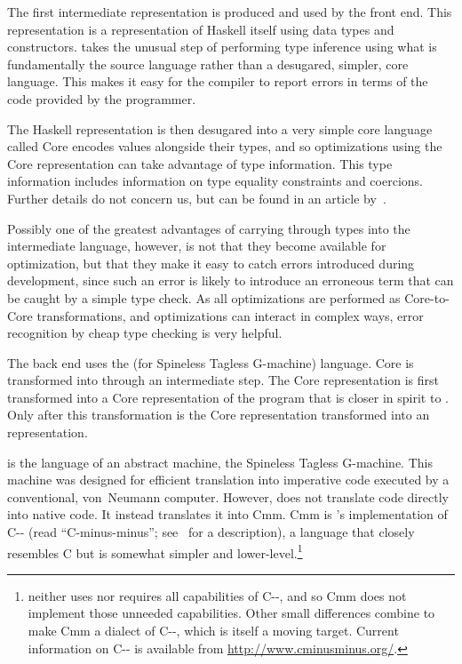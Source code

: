 The first intermediate representation is produced and used by the front end. This representation is a representation of Haskell itself using data types and constructors. \GHC takes the unusual step of performing type inference using what is fundamentally the source language rather than a desugared, simpler, core language. This makes it easy for the compiler to report errors in terms of the code provided by the programmer.

The Haskell representation is then desugared into a very simple core language called  Core encodes values alongside their types, and so optimizations using the Core representation can take advantage of type information. This type information includes information on type equality constraints and coercions. Further details do not concern us, but can be found in an article by~\citet{Sulzmann:System:2007}.

Possibly one of the greatest advantages of carrying through types into the intermediate language, however, is not that they become available for optimization, but that they make it easy to catch errors introduced during development, since such an error is likely to introduce an erroneous term that can be caught by a simple type check. As all optimizations are performed as Core-to-Core transformations, and optimizations can interact in complex ways, error recognition by cheap type checking is very helpful.

The back end uses the  (for Spineless Tagless G-machine) language. Core is transformed into  through an intermediate step. The Core representation is first transformed into a Core representation of the program that is closer in spirit to . Only after this transformation is the Core representation transformed into an  representation.

 is the language of an abstract machine, the Spineless Tagless G-machine. This machine was designed for efficient translation into imperative code executed by a conventional, von~Neumann computer. However, \GHC does not translate  code directly into native code. It instead translates it into Cmm. Cmm is \GHC{}'s implementation of C-{}- (read ``C-minus-minus''; see~\citet{Peyton-Jones:C--:1999} for a description), a language that closely resembles C but is somewhat simpler and lower-level.\footnote{\GHC neither uses nor requires all capabilities of C-{}-, and so Cmm does not implement those unneeded capabilities. Other small differences combine to make Cmm a dialect of C-{}-, which is itself a moving target. Current information on C-{}- is available from \url{http://www.cminusminus.org/}.}

